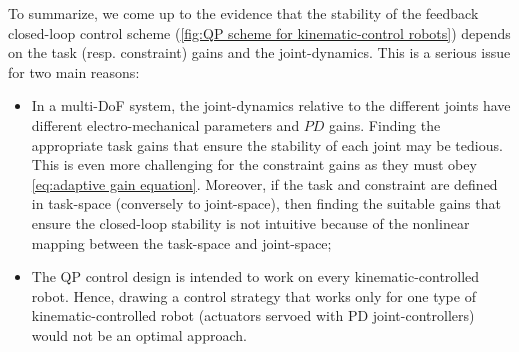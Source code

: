 To summarize, we come up to the evidence that the stability of the feedback closed-loop control scheme (\cref{fig:QP scheme for kinematic-control robots}) depends on the task (resp. constraint) gains and the joint-dynamics. This is a serious issue for two main reasons:
\begin{itemize}
	\item In a multi-DoF system, the joint-dynamics relative to the different joints have different electro-mechanical parameters and $PD$ gains. Finding the appropriate task gains that ensure the stability of each joint may be tedious. This is even more challenging for the constraint gains as they must obey \cref{eq:adaptive gain equation}. Moreover, if the task and constraint are defined in task-space (conversely to joint-space), then finding the suitable gains that ensure the closed-loop stability is not intuitive because of the nonlinear mapping between the task-space and joint-space; 
	\item The QP control design is intended to work on every kinematic-controlled robot. Hence, drawing a control strategy that works only for one type of kinematic-controlled robot (actuators servoed with PD joint-controllers) would not be an optimal approach.   	 
\end{itemize}

